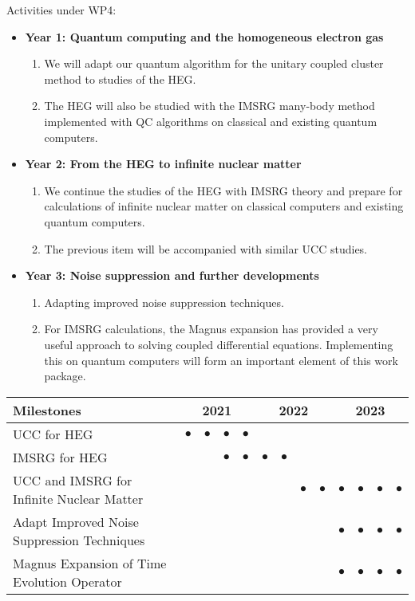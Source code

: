 \documentclass[11pt]{article}
\begin{document}
Activities under WP4:
\begin{itemize}
	\item \textbf{Year 1: Quantum computing and the homogeneous electron gas}
	\begin{enumerate}
	\item We will adapt our quantum algorithm for the unitary coupled cluster method to studies of the HEG. 
	\item The HEG will also be studied with the IMSRG many-body method implemented with QC algorithms on classical and existing quantum computers.
	\end{enumerate}
      \item \textbf{Year 2: From the HEG to infinite nuclear matter}
	\begin{enumerate}
	\item We continue the studies of the HEG with IMSRG theory and prepare for calculations of infinite nuclear matter on classical computers and existing quantum computers.
	\item The previous item will be accompanied with similar UCC studies. 
	\end{enumerate}
      \item \textbf{Year 3: Noise suppression and further developments}
        \begin{enumerate}
        \item Adapting improved noise suppression techniques.
        \item For IMSRG calculations, the Magnus expansion has provided a very useful approach to solving coupled differential equations. Implementing this on quantum computers will form an important element of this work package.
	\end{enumerate}
\end{itemize}



\begin{footnotesize}
\begin{center}
\begin{tabular}{|l|c|c|c|c|c|c|c|c|c|c|c|c|}
\hline
\multicolumn{1}{|l}{Milestones } & \multicolumn{4}{|c|}{ 2021 } & \multicolumn{4}{c|}{ 2022 } & \multicolumn{4}{c|}{ 2023 } \\
\hline
UCC for HEG &$\bullet$ &$\bullet$ & $\bullet$ & $\bullet$ & & & & & & & &  \\
\hline
IMSRG for HEG & & & $\bullet$ & $\bullet$ &$\bullet$  & $\bullet$ & & & & & & \\
\hline
UCC and IMSRG for Infinite Nuclear Matter & & & & & & &$\bullet$  &$\bullet$  &$\bullet$  &$\bullet$ &$\bullet$  &$\bullet$   \\
\hline
Adapt Improved Noise Suppression Techniques & && & &  & & &   &$\bullet$  &$\bullet$ &$\bullet$  &$\bullet$   \\
\hline
Magnus Expansion of Time Evolution Operator & && & &   &  &   &   &$\bullet$  &$\bullet$ &$\bullet$  &$\bullet$   \\
\hline

\end{tabular}
\end{center}
\end{footnotesize}
\end{document}
